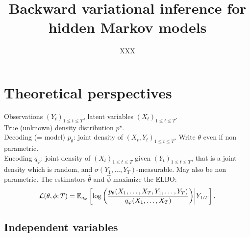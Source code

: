\documentclass{article}
\title{Backward variational inference for hidden Markov models}
\date{}
\author[$\dag$]{XXX}
\affil[$\dag$]{{\small }}
\newcommand{\1}{\mathbbm{1}}
\newcommand{\E}{\mathbb{E}}
\begin{document}
\maketitle

\begin{abstract}

\end{abstract}

\section{Theoretical perspectives}

Observations $(Y_{t})_{1\leq t \leq T}$, latent variables $(X_{t})_{1\leq t \leq T}$.\\
True (unknown) density distribution $p^{\star}$.\\
Decoding (= model) $p_{\theta}$: joint density of $(X_{t}, Y_{t})_{1\leq t \leq T}$. Write $\theta$ even if non parametric.\\
Encoding $q_{\varphi}$: joint density of $(X_{t})_{1\leq t \leq T}$ given $(Y_{t})_{1\leq t \leq T}$, that is a joint density which is random, and $\sigma(Y_{1},\ldots,Y_{T})$-measurable. May also be non parametric.  The estimators $\widehat{\theta}$ and $\widehat{\phi}$ maximize the ELBO:
$$
{\cal L}(\theta,\phi; T)= \E_{q_{\varphi}} \left[ \log \left( \frac{p_{\theta}(X_{1},\ldots,X_{T},Y_{1},\ldots,Y_{T})}{q_{\varphi}(X_{1},\ldots,X_{T})}\right)\middle\vert Y_{1:T}\right].
$$

\subsection{Independent variables}
\end{document}
